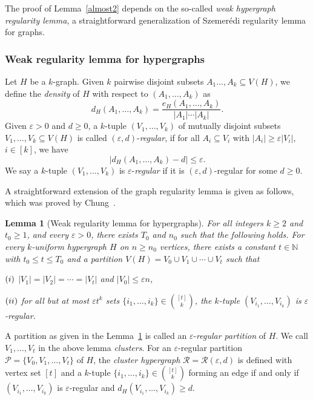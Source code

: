 \documentclass[11pt,a4paper]{article}
\newtheorem{lemma}[thm]{Lemma}
\theoremstyle{definition}
\begin{document}
The proof of Lemma~\ref{almost2} depends on the so-called {\emph{weak hypergraph regularity lemma}}, a straightforward generalization of Szemer\'edi regularity lemma for graphs.

\subsubsection{Weak regularity lemma for hypergraphs}

Let $H$ be a $k$-graph. Given $k$ pairwise disjoint subsets $A_1\dots ,A_k\subseteq V(H)$, we define the {\emph{density}} of $H$ with respect to $(A_1,\dots,A_k)$ as
$$d_H(A_1,\dots ,A_k)=\frac{e_H(A_1,\dots ,A_k)}{|A_1|\cdots |A_k|}.$$
Given $\varepsilon>0$ and $d\geq 0$, a $k$-tuple $(V_1,\dots ,V_k)$ of mutually disjoint subsets $V_1,\dots ,V_k\subseteq V(H)$ is called $(\varepsilon,d)$-{\emph{regular}}, if for all $A_i\subseteq V_i$ with $|A_i|\geq \varepsilon|V_i|$, $i\in [k]$, we have 
$$|d_H(A_1,\dots, A_k)-d|\leq \varepsilon.$$
We say a $k$-tuple $(V_1,\dots ,V_k)$ is $\varepsilon$-{\emph{regular}} if it is $(\varepsilon,d)$-regular for some $d\geq 0$.

A straightforward extension of the graph regularity lemma is given as follows, which was proved by Chung~\cite{weakc}.

\begin{lemma}[Weak regularity lemma for hypergraphs]\label{weak-reg}
For all integers $k\geq 2$ and $t_0\geq 1$, and every $\varepsilon>0$, there exists $T_0$ and $n_0$ such that the following holds. For every $k$-uniform hypergraph $H$ on $n\geq n_0$ vertices, there exists a constant $t\in \mathbb{N}$ with $t_0\leq t\leq T_0$ and a partition $V(H)=V_0\cup V_1\cup \cdots \cup V_t$ such that 

$({\rm i})$ $|V_1|=|V_2|=\cdots =|V_t|$ and $|V_0|\leq \varepsilon n$,

$({\rm ii})$ for all but at most $\varepsilon t^k$ sets $\{i_1,\dots ,i_k\}\in \binom{[t]}{k}$, the $k$-tuple $(V_{i_1},\dots ,V_{i_k})$ is $\varepsilon$-regular.

    
\end{lemma}


A partition as given in the Lemma~\ref{weak-reg} is called an $\varepsilon$-{\emph{regular partition}} of $H$. We call $V_1,\dots ,V_t$ in the above lemma {\emph{clusters}}. For an $\varepsilon$-regular partition $\mathcal{P}=\{V_0,V_1,\dots ,V_t\}$ of $H$, the {\emph{cluster hypergraph}} $\mathcal{R}=\mathcal{R}(\varepsilon ,d)$ is defined with vertex set $[t]$ and a $k$-tuple $\{i_1,\dots, i_k\}\in \binom{[t]}{k}$ forming an edge if and only if $(V_{i_1},\dots,V_{i_k})$ is $\varepsilon$-regular and $d_H(V_{i_1},\dots,V_{i_k})\geq d$.
\end{document}
